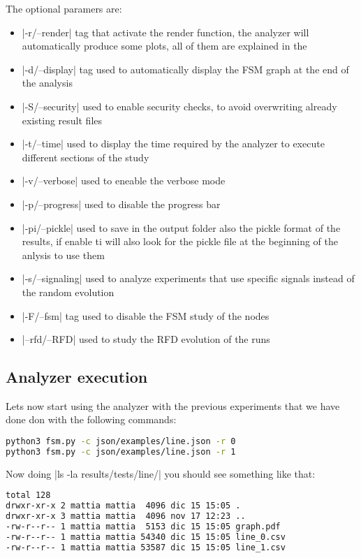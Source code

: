 \documentclass[10pt,journal,onecolumn]{IEEEtran}
\begin{document}
The optional paramers are:
\begin{itemize}
	\item |-r/--render| tag that activate the render function, the analyzer
		will automatically produce some plots, all of them are explained in the
	\item |-d/--display| tag used to automatically display the \ac{FSM}
		graph at the end of the analysis
	\item |-S/--security| used to enable security checks, to avoid
		overwriting already existing result files
	\item |-t/--time| used to display the time required by the analyzer
		to execute different sections of the study
	\item |-v/--verbose| used to eneable the verbose mode
	\item |-p/--progress| used to disable the progress bar
	\item |-pi/--pickle| used to save in the output folder also the pickle
		format of the results, if enable ti will also look for the pickle
		file at the beginning of the anlysis to use them
	\item |-s/--signaling| used to analyze experiments that use specific
		signals instead of the random evolution
	\item |-F/--fsm| tag used to disable the \ac{FSM} study of the nodes
	\item |--rfd/--RFD| used to study the \ac{RFD} evolution of the runs
\end{itemize}

\subsection{Analyzer execution}
\label{subsec:anal_exec}

Lets now start using the analyzer with the previous experiments that we have done
don with the following commands:
\begin{lstlisting}[language=bash]
python3 fsm.py -c json/examples/line.json -r 0
python3 fsm.py -c json/examples/line.json -r 1
\end{lstlisting}

Now doing |ls -la results/tests/line/| you should see something like that:
\begin{lstlisting}[language=bash]
total 128
drwxr-xr-x 2 mattia mattia  4096 dic 15 15:05 .
drwxr-xr-x 3 mattia mattia  4096 nov 17 12:23 ..
-rw-r--r-- 1 mattia mattia  5153 dic 15 15:05 graph.pdf
-rw-r--r-- 1 mattia mattia 54340 dic 15 15:05 line_0.csv
-rw-r--r-- 1 mattia mattia 53587 dic 15 15:05 line_1.csv
\end{lstlisting}
\end{document}

